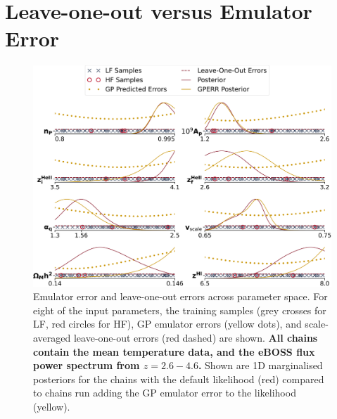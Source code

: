 

\section{Leave-one-out versus Emulator Error}
\label{sec:loovsgperr}
\begin{figure}
    \centering
    \includegraphics[width=\textwidth]{figures/loo_vs_emu_error_wlegend.pdf}
    \caption{\label{fig:loo_v_emu}
    Emulator error and leave-one-out errors across parameter space.
    For eight of the input parameters, the training samples (grey crosses for LF, red circles for HF), GP emulator errors (yellow dots), and scale-averaged leave-one-out errors (red dashed) are shown. \textbf{All chains contain the mean temperature data, and the eBOSS flux power spectrum from $z=2.6 - 4.6$.}
    Shown are 1D marginalised posteriors for the chains with the default likelihood (red) compared to chains run adding the GP emulator error to the likelihood (yellow).
    }
\end{figure}

